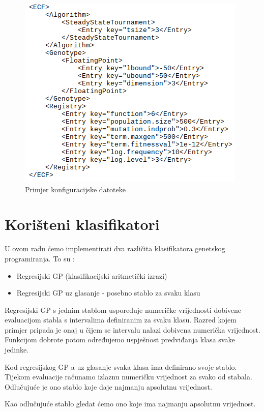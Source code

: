 \documentclass[times, utf8, zavrsni]{fer}
\begin{document}
\begin{figure}[htb]
\centering
\includegraphics[scale=0.6]{images/xml2}
\caption{Primjer konfiguracijske datoteke}
\end{figure}

\section{Korišteni klasifikatori}



U ovom radu ćemo implementirati dva različita klasifikatora genetskog programiranja. To su :

\begin{itemize}
\item Regresijski GP (klasifikacijski aritmetički izrazi)
\item Regresijski GP uz glasanje - posebno stablo za svaku klasu
\end{itemize}


Regresijski GP s jednim stablom uspoređuje numeričke vrijednosti dobivene evaluacijom stabla s intervalima definiranim za svaku klasu. Razred kojem primjer pripada je onaj u čijem se intervalu nalazi dobivena numerička vrijednost. Funkcijom dobrote potom određujemo uspješnost predviđanja klasa svake jedinke.

Kod regresijskog GP-a uz glasanje svaka klasa ima definirano svoje stablo.  Tijekom evaluacije računamo izlaznu numeričku vrijednost za svako od stabala. Odlučujuće je ono stablo koje daje najmanju apsolutnu vrijednost.

Kao odlučujuće stablo gledat ćemo ono koje ima najmanju apsolutnu vrijednost. 
\end{document}
